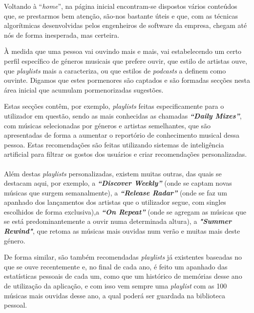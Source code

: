 \documentclass{report}
\begin{document}
Voltando à ``\textit{home}'', na página inicial encontram-se dispostos vários conteúdos que, se prestarmos bem atenção, são-nos bastante úteis e que, com as técnicas algorítmicas desenvolvidas pelos engenheiros de software da empresa, chegam até nós de forma inesperada, mas certeira. 

À medida que uma pessoa vai ouvindo mais e mais, vai estabelecendo um certo perfil específico de géneros musicais que prefere ouvir, que estilo de artistas ouve, que \textit{playlists} mais a caracteriza, ou que estilos de \textit{podcasts} a definem como ouvinte. Digamos que estes pormenores são captados e são formadas secções nesta área inicial que acumulam pormenorizadas sugestões.

Estas secções contêm, por exemplo, \textit{playlists} feitas especificamente para o utilizador em questão, sendo as mais conhecidas as chamadas \textit{\textbf{“Daily Mixes”}}, com músicas selecionadas por géneros e artistas semelhantes, que são apresentadas de forma a aumentar o reportório de conhecimento musical dessa pessoa. Estas recomendações são feitas utilizando sistemas de inteligência artificial para filtrar os gostos dos usuários e criar recomendações personalizadas.

\paragraph{} 

Além destas \textit{playlists} personalizadas, existem muitas outras, das quais se destacam aqui, por exemplo, a \textit{\textbf{“Discover Weekly”}} (onde se captam novas músicas que surgem semanalmente), a \textit{\textbf{“Release Radar”}} (onde se faz um apanhado dos lançamentos dos artistas que o utilizador segue, com singles escolhidos de forma exclusiva),a \textit{\textbf{“On Repeat”}} (onde se agregam as músicas que se está predominantemente a ouvir numa determinada altura), a  \textit{\textbf{"Summer Rewind"}}, que retoma as músicas mais ouvidas num verão e muitas mais deste género.

 De forma similar, são também recomendadas \textit{playlists} já existentes baseadas no que se ouve recentemente e, no final de cada ano, é feito um apanhado das estatísticas pessoais de cada um, como que um histórico de memórias desse ano de utilização da aplicação, e com isso vem sempre uma \textit{playlist} com as 100 músicas mais ouvidas desse ano, a qual poderá ser guardada na biblioteca pessoal.
 
\end{document}
